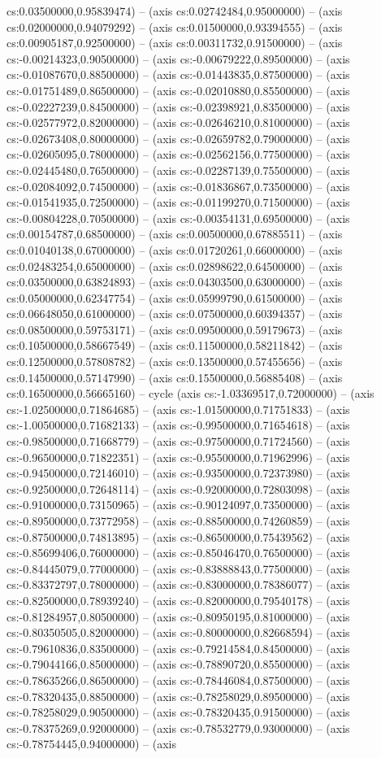 cs:0.03500000,0.95839474) -- (axis cs:0.02742484,0.95000000) -- (axis cs:0.02000000,0.94079292) -- (axis cs:0.01500000,0.93394555) -- (axis cs:0.00905187,0.92500000) -- (axis cs:0.00311732,0.91500000) -- (axis cs:-0.00214323,0.90500000) -- (axis cs:-0.00679222,0.89500000) -- (axis cs:-0.01087670,0.88500000) -- (axis cs:-0.01443835,0.87500000) -- (axis cs:-0.01751489,0.86500000) -- (axis cs:-0.02010880,0.85500000) -- (axis cs:-0.02227239,0.84500000) -- (axis cs:-0.02398921,0.83500000) -- (axis cs:-0.02577972,0.82000000) -- (axis cs:-0.02646210,0.81000000) -- (axis cs:-0.02673408,0.80000000) -- (axis cs:-0.02659782,0.79000000) -- (axis cs:-0.02605095,0.78000000) -- (axis cs:-0.02562156,0.77500000) -- (axis cs:-0.02445480,0.76500000) -- (axis cs:-0.02287139,0.75500000) -- (axis cs:-0.02084092,0.74500000) -- (axis cs:-0.01836867,0.73500000) -- (axis cs:-0.01541935,0.72500000) -- (axis cs:-0.01199270,0.71500000) -- (axis cs:-0.00804228,0.70500000) -- (axis cs:-0.00354131,0.69500000) -- (axis cs:0.00154787,0.68500000) -- (axis cs:0.00500000,0.67885511) -- (axis cs:0.01040138,0.67000000) -- (axis cs:0.01720261,0.66000000) -- (axis cs:0.02483254,0.65000000) -- (axis cs:0.02898622,0.64500000) -- (axis cs:0.03500000,0.63824893) -- (axis cs:0.04303500,0.63000000) -- (axis cs:0.05000000,0.62347754) -- (axis cs:0.05999790,0.61500000) -- (axis cs:0.06648050,0.61000000) -- (axis cs:0.07500000,0.60394357) -- (axis cs:0.08500000,0.59753171) -- (axis cs:0.09500000,0.59179673) -- (axis cs:0.10500000,0.58667549) -- (axis cs:0.11500000,0.58211842) -- (axis cs:0.12500000,0.57808782) -- (axis cs:0.13500000,0.57455656) -- (axis cs:0.14500000,0.57147990) -- (axis cs:0.15500000,0.56885408) -- (axis cs:0.16500000,0.56665160) -- cycle (axis cs:-1.03369517,0.72000000) -- (axis cs:-1.02500000,0.71864685) -- (axis cs:-1.01500000,0.71751833) -- (axis cs:-1.00500000,0.71682133) -- (axis cs:-0.99500000,0.71654618) -- (axis cs:-0.98500000,0.71668779) -- (axis cs:-0.97500000,0.71724560) -- (axis cs:-0.96500000,0.71822351) -- (axis cs:-0.95500000,0.71962996) -- (axis cs:-0.94500000,0.72146010) -- (axis cs:-0.93500000,0.72373980) -- (axis cs:-0.92500000,0.72648114) -- (axis cs:-0.92000000,0.72803098) -- (axis cs:-0.91000000,0.73150965) -- (axis cs:-0.90124097,0.73500000) -- (axis cs:-0.89500000,0.73772958) -- (axis cs:-0.88500000,0.74260859) -- (axis cs:-0.87500000,0.74813895) -- (axis cs:-0.86500000,0.75439562) -- (axis cs:-0.85699406,0.76000000) -- (axis cs:-0.85046470,0.76500000) -- (axis cs:-0.84445079,0.77000000) -- (axis cs:-0.83888843,0.77500000) -- (axis cs:-0.83372797,0.78000000) -- (axis cs:-0.83000000,0.78386077) -- (axis cs:-0.82500000,0.78939240) -- (axis cs:-0.82000000,0.79540178) -- (axis cs:-0.81284957,0.80500000) -- (axis cs:-0.80950195,0.81000000) -- (axis cs:-0.80350505,0.82000000) -- (axis cs:-0.80000000,0.82668594) -- (axis cs:-0.79610836,0.83500000) -- (axis cs:-0.79214584,0.84500000) -- (axis cs:-0.79044166,0.85000000) -- (axis cs:-0.78890720,0.85500000) -- (axis cs:-0.78635266,0.86500000) -- (axis cs:-0.78446084,0.87500000) -- (axis cs:-0.78320435,0.88500000) -- (axis cs:-0.78258029,0.89500000) -- (axis cs:-0.78258029,0.90500000) -- (axis cs:-0.78320435,0.91500000) -- (axis cs:-0.78375269,0.92000000) -- (axis cs:-0.78532779,0.93000000) -- (axis cs:-0.78754445,0.94000000) -- (axis 